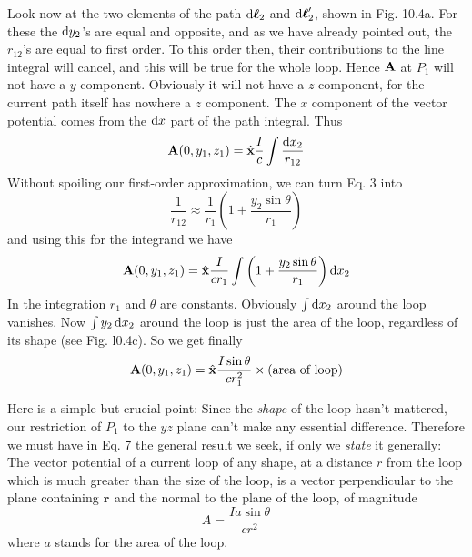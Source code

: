 Look now at the two elements of the path $\operatorname{d\!}\boldsymbol{\ell}_2$ and $\operatorname{d\!}\boldsymbol{\ell}_2'$, shown in
Fig. 10.4a. For these the $\operatorname{d\!} y_2$'s are equal and opposite, and as we
have already pointed out, the $r_{12}$'s are equal to first order. To this
order then, their contributions to the line integral will cancel, and
this will be true for the whole loop. Hence $\mathbf{A}$ at $P_1$ will not have a
$y$ component. Obviously it will not have a $z$ component, for the
current path itself has nowhere a $z$ component. The $x$ component
of the vector potential comes from the $\operatorname{d\!} x$ part of the path integral.
Thus
\begin{equation}
  \mathbf{A}(0,y_1,z_1) = \hat{\mathbf{x}}\frac{I}{c}\int\frac{\operatorname{d\!} x_2}{r_{12}}
\end{equation}
Without spoiling our first-order approximation, we can turn Eq. 3
into
\begin{equation}
  \frac{1}{r_{12}} \approx \frac{1}{r_1}\left(1+\frac{y_2\sin\theta}{r_1}\right)
\end{equation}
and using this for the integrand we have
\begin{equation}
  \mathbf{A}(0,y_1,z_1) = \hat{\mathbf{x}}\frac{I}{cr_1}\int \left(1+\frac{y_2\sin\theta}{r_1}\right)\operatorname{d\!} x_2
\end{equation}
In the integration $r_1$ and $\theta$ are constants. Obviously $\int\operatorname{d\!} x_2$ around
the loop vanishes. Now $\int y_2\operatorname{d\!} x_2$ around the loop is just the area
of the loop, regardless of its shape (see Fig. l0.4c). So we get finally
\begin{equation}
  \mathbf{A}(0,y_1,z_1) = \hat{\mathbf{x}}\frac{I\sin\theta}{cr_1^2}\times(\text{area of loop})
\end{equation}

Here is a simple but crucial point: Since the \emph{shape} of the loop
hasn't mattered, our restriction of $P_1$ to the $yz$ plane can't make any
essential difference. Therefore we must have in Eq. 7 the general
result we seek, if only we \emph{state} it generally: The vector potential of
a current loop of any shape, at a distance $r$ from the loop which is
much greater than the size of the loop, is a vector perpendicular to
the plane containing $\mathbf{r}$ and the normal to the plane of the loop, of
magnitude
\begin{equation}
  A = \frac{Ia\sin\theta}{cr^2}
\end{equation}
where $a$ stands for the area of the loop.

